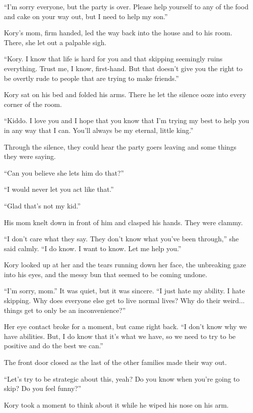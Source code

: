 ``I'm sorry everyone, but the party is over. Please help yourself to any of the food and cake on your way out, but I need to help my son.''

Kory's mom, firm handed, led the way back into the house and to his room. There, she let out a palpable sigh.

``Kory. I know that life is hard for you and that skipping seemingly ruins everything. Trust me, I know, first-hand. But that doesn't give you the right to be overtly rude to people that are trying to make friends.''

Kory sat on his bed and folded his arms. There he let the silence ooze into every corner of the room.

``Kiddo. I love you and I hope that you know that I'm trying my best to help you in any way that I can. You'll always be my eternal, little king.''

Through the silence, they could hear the party goers leaving and some things they were saying.

``Can you believe she lets him do that?''

``I would never let you act like that.''

``Glad that's not my kid.''

His mom knelt down in front of him and clasped his hands. They were clammy.

``I don't care what they say. They don't know what you've been through,'' she said calmly. ``I do know. I want to know. Let me help you.''

Kory looked up at her and the tears running down her face, the unbreaking gaze into his eyes, and the messy bun that seemed to be coming undone.

``I'm sorry, mom.'' It was quiet, but it was sincere. ``I just hate my ability. I hate skipping. Why does everyone else get to live normal lives? Why do their weird... things get to only be an inconvenience?''

Her eye contact broke for a moment, but came right back. ``I don't know why we have abilities. But, I do know that it's what we have, so we need to try to be positive and do the best we can.''

The front door closed as the last of the other families made their way out.

``Let's try to be strategic about this, yeah? Do you know when you're going to skip? Do you feel funny?''

Kory took a moment to think about it while he wiped his nose on his arm.

